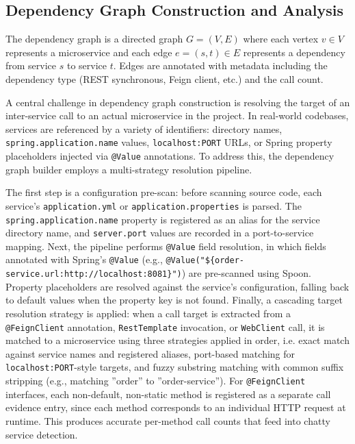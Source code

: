 \subsection{Dependency Graph Construction and Analysis}
\label{subsec:graph-analysis}

\par The dependency graph is a directed graph $G = (V, E)$ where each vertex $v \in V$ represents a microservice and each edge $e = (s, t) \in E$ represents a dependency from service $s$ to service $t$. Edges are annotated with metadata including the dependency type (REST synchronous, Feign client, etc.) and the call count.

\par A central challenge in dependency graph construction is resolving the target of an inter-service call to an actual microservice in the project. In real-world codebases, services are referenced by a variety of identifiers: directory names, \texttt{spring\-.application.name} values, \texttt{localhost:PORT} URLs, or Spring property placeholders injected via \texttt{@Value} annotations. To address this, the dependency graph builder employs a multi-strategy resolution pipeline.

\par The first step is a configuration pre-scan: before scanning source code, each service's \texttt{application.yml} or \texttt{application.properties} is parsed. The \texttt{spring\-.application.name} property is registered as an alias for the service directory name, and \texttt{server.port} values are recorded in a port-to-service mapping. Next, the pipeline performs \texttt{@Value} field resolution, in which fields annotated with Spring's \texttt{@Value} (e.g., \texttt{@Value("\$\{order\--service.url:http://localhost:8081\}")}) are pre-scanned using Spoon. Property placeholders are resolved against the service's configuration, falling back to default values when the property key is not found. Finally, a cascading target resolution strategy is applied: when a call target is extracted from a \texttt{@FeignClient} annotation, \texttt{RestTemplate} invocation, or \texttt{WebClient} call, it is matched to a microservice using three strategies applied in order, i.e. exact match against service names and registered aliases, port-based matching for \texttt{localhost:PORT}-style targets, and fuzzy substring matching with common suffix stripping (e.g., matching ''order'' to ''order-service''). For \texttt{@FeignClient} interfaces, each non-default, non-static method is registered as a separate call evidence entry, since each method corresponds to an individual HTTP request at runtime. This produces accurate per-method call counts that feed into chatty service detection.


